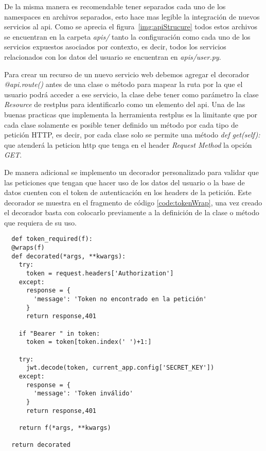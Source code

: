 De la misma manera es recomendable tener separados cada uno de los namespaces en archivos separados, esto hace mas legible la integración de nuevos servicios al api. Como se aprecia el figura~\ref{img:apiStrucure} todos estos archivos se encuentran en la carpeta \textit{apis/} tanto la configuración como cada uno de los servicios expuestos asociados por contexto, es decir, todos los servicios relacionados con los datos del usuario se encuentran en \textit{apis/user.py}.

Para crear un recurso de un nuevo servicio web debemos agregar el decorador \textit{@api.route()} antes de una clase o método para mapear la ruta por la que el usuario podrá acceder a ese servicio, la clase debe tener como parámetro la clase \textit{Resource} de restplus para identificarlo como un elemento del api. Una de las buenas practicas que implementa la herramienta restplus es la limitante que por cada clase solamente es posible tener definido un método por cada tipo de petición HTTP, es decir, por cada clase solo se permite una método \textit{def get(self):} que atenderá la peticion http que tenga en el header \textit{Request Method} la opción \textit{GET}.

De manera adicional se implemento un decorador personalizado para validar que las peticiones que tengan que hacer uso de los datos del usuario o la base de datos cuenten con el token de autenticación en los headers de la petición. Este decorador se muestra en el fragmento de código \ref{code:tokenWrap}, una vez creado el decorador basta con colocarlo previamente a la definición de la clase o método que requiera de su uso.

\begin{code}
\label{code:tokenWrap}
\begin{verbatim}
  def token_required(f):
  @wraps(f)
  def decorated(*args, **kwargs):
    try:
      token = request.headers['Authorization']
    except:
      response = {
        'message': 'Token no encontrado en la petición'
      }
      return response,401

    if "Bearer " in token:
      token = token[token.index(' ')+1:]

    try:
      jwt.decode(token, current_app.config['SECRET_KEY'])
    except:
      response = {
        'message': 'Token inválido'
      }
      return response,401

    return f(*args, **kwargs)

  return decorated
\end{verbatim}
\end{code}